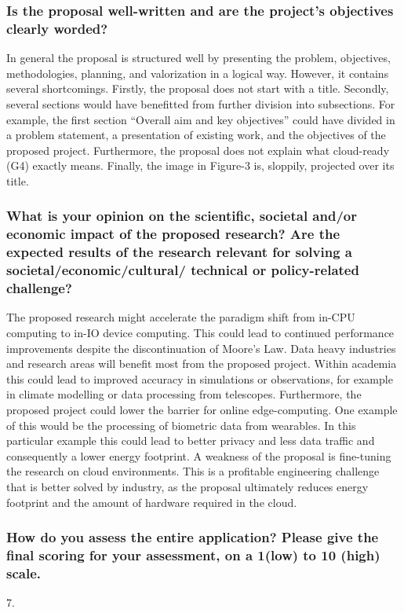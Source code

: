 \subsubsection*{Is the proposal well-written and are the project’s objectives clearly worded?}
In general the proposal is structured well by presenting the problem, objectives, methodologies, planning, and valorization in a logical way. However, it contains several shortcomings. Firstly, the proposal does not start with a title. Secondly, several sections would have benefitted from further division into subsections. For example, the first section ``Overall aim and key objectives'' could have divided in a problem statement, a presentation of existing work, and the objectives of the proposed project. Furthermore, the proposal does not explain what cloud-ready (G4) exactly means. Finally, the image in Figure-3 is, sloppily, projected over its title.

\subsubsection*{What is your opinion on the scientific, societal and/or economic impact of the proposed research? Are the expected results of the research relevant for solving a societal/economic/cultural/ technical or policy-related challenge?}
The proposed research might accelerate the paradigm shift from in-CPU computing to in-IO device computing. This could lead to continued performance improvements despite the discontinuation of Moore's Law. Data heavy industries and research areas will benefit most from the proposed project. Within academia this could lead to improved accuracy in simulations or observations, for example in climate modelling or data processing from telescopes. Furthermore, the proposed project could lower the barrier for online edge-computing. One example of this would be the processing of biometric data from wearables. In this particular example this could lead to better privacy and less data traffic and consequently a lower energy footprint. A weakness of the proposal is fine-tuning the research on cloud environments. This is a profitable engineering challenge that is better solved by industry, as the proposal ultimately reduces energy footprint and the amount of hardware required in the cloud.

\subsubsection*{How do you assess the entire application? Please give the final scoring for your assessment, on a 1(low) to 10 (high) scale.}
7.

